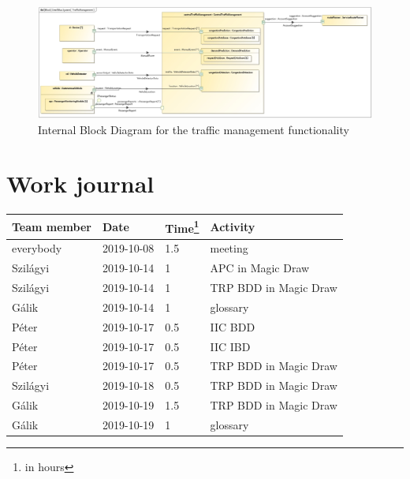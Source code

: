 \documentclass[a4paper]{article}
\begin{document}
\begin{figure}
	\centering
	\includegraphics[width=\textwidth]{ibd-trafficmanagement.jpg}
	\caption{Internal Block Diagram for the traffic management
		functionality}%
	\label{fig:ibd-trafficmanagement}
\end{figure}




\section{Work journal}

\begin{tabularx}{\textwidth}{l l l X}
	\toprule
	Team member & Date       & Time\footnote{in hours} & Activity              \\ \midrule
	everybody   & 2019-10-08 & 1.5                     & meeting               \\
	Szilágyi    & 2019-10-14 & 1                       & APC in Magic Draw     \\
	Szilágyi    & 2019-10-14 & 1                       & TRP BDD in Magic Draw \\
	Gálik       & 2019-10-14 & 1                       & glossary              \\
	Péter       & 2019-10-17 & 0.5                     & IIC BDD               \\
	Péter       & 2019-10-17 & 0.5                     & IIC IBD               \\
	Péter       & 2019-10-17 & 0.5                     & TRP BDD in Magic Draw \\
	Szilágyi    & 2019-10-18 & 0.5                     & TRP BDD in Magic Draw \\
	Gálik       & 2019-10-19 & 1.5                     & TRP BDD in Magic Draw \\
	Gálik       & 2019-10-19 & 1                       & glossary \\
	\bottomrule
\end{tabularx}

\clearpage
\glsaddall
\printglossaries
\end{document}
